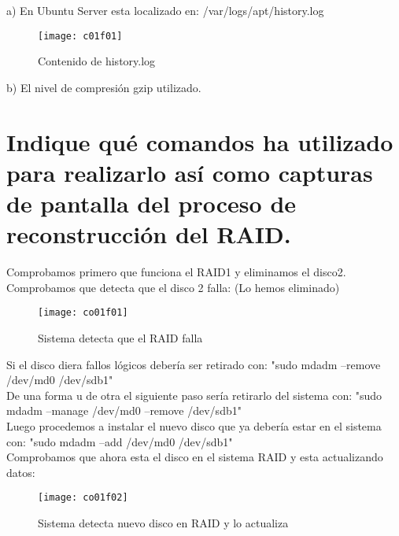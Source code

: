 a) En Ubuntu Server esta localizado en: /var/logs/apt/history.log

\begin{figure}[H]
	\centering
	\texttt{[image: c01f01]}
	\caption{Contenido de history.log}
	\label{fig:c01f01}
\end{figure}


b) El nivel de compresión gzip utilizado.


\section{Indique qué comandos ha utilizado para realizarlo así como capturas de pantalla del proceso de reconstrucción del RAID. \cite{c01o}}

Comprobamos primero que funciona el RAID1 y eliminamos el disco2. Comprobamos que detecta que el disco 2 falla: (Lo hemos eliminado)

\begin{figure}[H]
	\centering
	\texttt{[image: co01f01]}
	\caption{Sistema detecta que el RAID falla}
	\label{fig:co01f01}
\end{figure}


Si el disco diera fallos lógicos debería ser retirado con: "sudo mdadm --remove /dev/md0 /dev/sdb1"\\

De una forma u de otra el siguiente paso sería retirarlo del sistema con: "sudo mdadm --manage /dev/md0 --remove /dev/sdb1"\\

Luego procedemos a instalar el nuevo disco que ya debería estar en el sistema con: "sudo mdadm --add /dev/md0 /dev/sdb1"\\

Comprobamos que ahora esta el disco en el sistema RAID y esta actualizando datos:

\begin{figure}[H]
	\centering
	\texttt{[image: co01f02]}
	\caption{Sistema detecta nuevo disco en RAID y lo actualiza}
	\label{fig:co01f02}
\end{figure}



